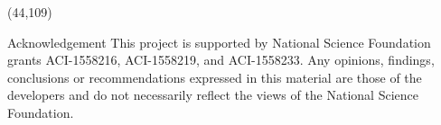 \documentclass[final]{beamer}
\begin{document}
\begin{frame}{}
\begin{textblock}{38.0}(44,109)
\begin{block}{Acknowledgement}
This project is supported by National Science Foundation grants ACI-1558216, ACI-1558219, and ACI-1558233. Any opinions, findings, conclusions or recommendations expressed in this material are those of the developers and do not necessarily reflect the views of the National Science Foundation. \\

\end{block}
\end{textblock}




\end{frame}
\end{document}
